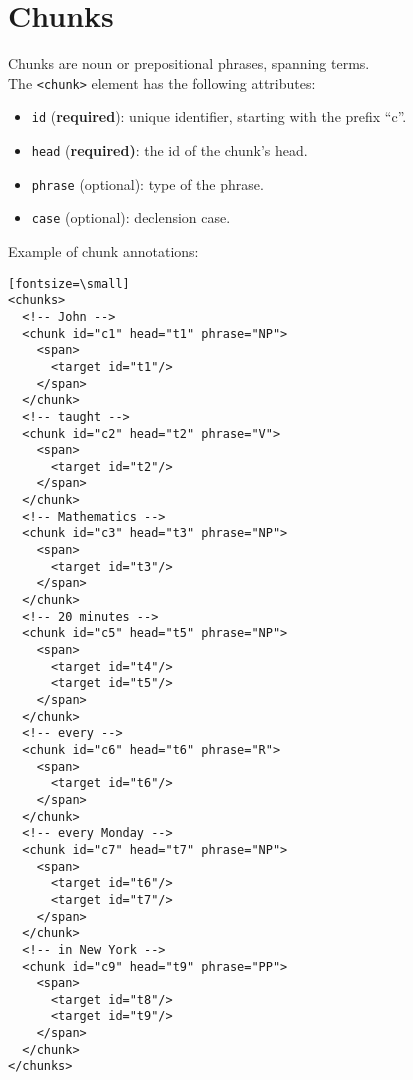 
\section{Chunks}
\label{sec:chunks}

Chunks are noun or prepositional phrases, spanning terms.\\

The \texttt{<chunk>} element has the following attributes:
\begin{itemize}
\item \texttt{id} (\textbf{required}): unique identifier, starting with the prefix ``c''.
\item \texttt{head} (\textbf{required)}: the id of the chunk's head.
\item \texttt{phrase} (optional): type of the phrase.
\item \texttt{case} (optional): declension case.
\end{itemize}

Example of chunk annotations:
\begin{verbatim}[fontsize=\small]
<chunks>
  <!-- John -->
  <chunk id="c1" head="t1" phrase="NP">
    <span>
      <target id="t1"/>
    </span>
  </chunk>
  <!-- taught -->
  <chunk id="c2" head="t2" phrase="V">
    <span>
      <target id="t2"/>
    </span>
  </chunk>
  <!-- Mathematics -->
  <chunk id="c3" head="t3" phrase="NP">
    <span>
      <target id="t3"/>
    </span>
  </chunk>
  <!-- 20 minutes -->
  <chunk id="c5" head="t5" phrase="NP">
    <span>
      <target id="t4"/>
      <target id="t5"/>
    </span>
  </chunk>
  <!-- every -->
  <chunk id="c6" head="t6" phrase="R">
    <span>
      <target id="t6"/>
    </span>
  </chunk>
  <!-- every Monday -->
  <chunk id="c7" head="t7" phrase="NP">
    <span>
      <target id="t6"/>
      <target id="t7"/>
    </span>
  </chunk>
  <!-- in New York -->
  <chunk id="c9" head="t9" phrase="PP">
    <span>
      <target id="t8"/>
      <target id="t9"/>
    </span>
  </chunk>
</chunks>
\end{verbatim}


